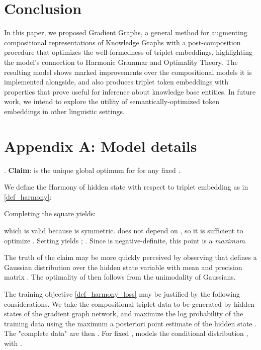 \documentclass[a4paper,10pt]{article}
\begin{document}
\section{Conclusion} \label{sec_conclusion}

In this paper, we proposed Gradient Graphs, a general method for augmenting compositional representations of Knowledge Graphs with a post-composition procedure that optimizes the well-formedness of triplet embeddings, highlighting the model's connection to Harmonic Grammar and Optimality Theory. The resulting model shows marked improvements over the compositional models it is implemented alongside, and also produces triplet token embeddings with properties that prove useful for inference about knowledge base entities. In future work, we intend to explore the utility of semantically-optimized token embeddings in other linguistic settings.






\section{Appendix A: Model details }

\ex. \textbf{Claim}:  is the unique global optimum for  for any fixed . \label{claim_mean_optimum}

We define the Harmony of hidden state  with respect to triplet embedding  as in \ref{def_harmony}:

Completing the square yields:
\begin{flushleft}{\scriptsize
}\end{flushleft}
which is valid because  is symmetric.  does not depend on , so it is sufficient to optimize . Setting  yields ; . Since  is negative-definite, this point is a \emph{maximum}. 

The truth of the claim may be more quickly perceived by observing that  defines a Gaussian distribution over the hidden state variable  with mean  and precision matrix . The optimality of  then follows from the unimodality of Gaussians. 

The training objective \ref{def_harmony_loss} may be justified by the following considerations. We take the compositional triplet data to be generated by hidden states of the gradient graph network, and maximize the log probability of the training data using the maximum a posteriori point estimate of the hidden state . The "complete data" are then . For fixed ,  models the conditional distribution , with 
\ex. 
\end{document}
